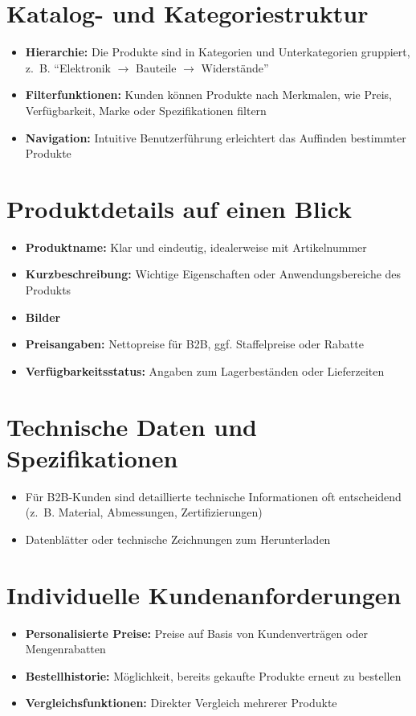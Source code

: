 \documentclass[%
	12pt,
	a4paper,
	oneside,
	parskip=full
]{scrbook}
\begin{document}
\section{Katalog- und Kategoriestruktur}
\begin{itemize}
	\item \textbf{Hierarchie:} Die Produkte sind in Kategorien und Unterkategorien gruppiert, z.~B. \enquote{Elektronik $\rightarrow$ Bauteile $\rightarrow$ Widerstände}
	\item \textbf{Filterfunktionen:} Kunden können Produkte nach Merkmalen, wie Preis, Verfügbarkeit, Marke oder Spezifikationen filtern
	\item \textbf{Navigation:} Intuitive Benutzerführung erleichtert das Auffinden bestimmter Produkte
\end{itemize}
\section{Produktdetails auf einen Blick}
\begin{itemize}
	\item \textbf{Produktname:} Klar und eindeutig, idealerweise mit Artikelnummer
	\item \textbf{Kurzbeschreibung:} Wichtige Eigenschaften oder Anwendungsbereiche des Produkts
	\item \textbf{Bilder}
	\item \textbf{Preisangaben:} Nettopreise für B2B, ggf. Staffelpreise oder Rabatte
	\item \textbf{Verfügbarkeitsstatus:} Angaben zum Lagerbeständen oder Lieferzeiten
\end{itemize}
\section{Technische Daten und Spezifikationen}
\begin{itemize}
	\item Für B2B-Kunden sind detaillierte technische Informationen oft entscheidend (z.~B. Material, Abmessungen, Zertifizierungen)
	\item Datenblätter oder technische Zeichnungen zum Herunterladen
\end{itemize}
\section{Individuelle Kundenanforderungen}
\begin{itemize}
	\item \textbf{Personalisierte Preise:} Preise auf Basis von Kundenverträgen oder Mengenrabatten
	\item \textbf{Bestellhistorie:} Möglichkeit, bereits gekaufte Produkte erneut zu bestellen
	\item \textbf{Vergleichsfunktionen:} Direkter Vergleich mehrerer Produkte
\end{itemize}
\end{document}
